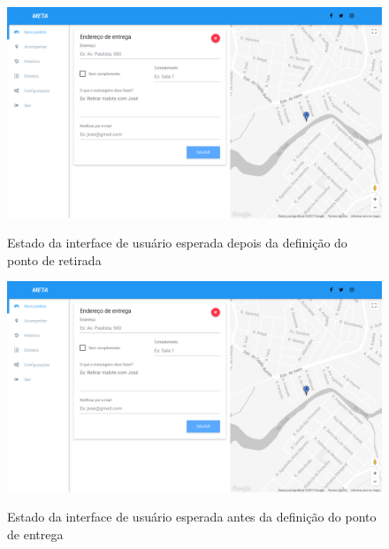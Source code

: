 \begin{apendicesenv}
		\begin{figure}[!h]
			\centering
			\caption{Estado da interface de usuário esperada depois da definição do ponto de retirada}
			\includegraphics[width=1\textwidth]{./img/depois-retirada}
			\label{fig:depois-retirada}
		\end{figure}

		\begin{figure}[!h]
			\centering
			\caption{Estado da interface de usuário esperada antes da definição do ponto de entrega}
			\includegraphics[width=1\textwidth]{./img/depois-retirada}
			\label{fig:antes-entrega}
		\end{figure}
		

\end{apendicesenv}
